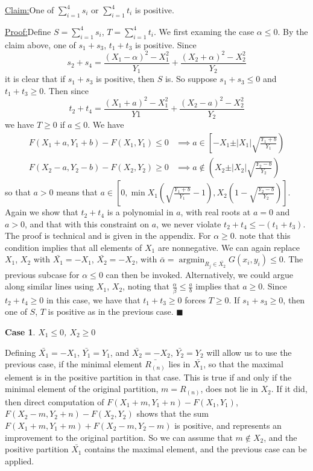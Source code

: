 \documentclass{article}
\theoremstyle{case}
\newtheorem{case}{Case}
\DeclareMathOperator*{\argmin}{argmin} %
\newenvironment{claim}[1]{\par\noindent\underline{Claim:}\space#1}{}
\newenvironment{claimproof}[1]{\par\noindent\underline{Proof:}\space#1}{\hfill $\blacksquare$}
\begin{document}
\begin{claim}
One of $\sum_{i=1}^4 s_i$ or $\sum_{i=1}^4 t_i$ is positive.
\end{claim}
\begin{claimproof}
Define $S =\sum_{i=1}^4 s_i$, $T = \sum_{i=1}^4 t_i$. We first examing the case $\alpha \leq 0$. By the claim above, one of $s_1 + s_3$, $t_1 + t_3$ is positive. Since
\[
s_2 + s_4 = \frac{\left( X_1 - \alpha\right)^2 - X_1^2}{Y_1} + \frac{\left( X_2 + \alpha\right)^2 - X_2^2}{Y_2} 
\]
it is clear that if $s_1 + s_3$ is positive, then $S$ is. So suppose $s_1 + s_3 \leq 0$ and $t_1 + t_3 \geq 0$. Then since
\[
t_2 + t_4  = \frac{\left( X_1 + a\right)^2 - X_1^2}{Y1} + \frac{\left( X_2 - a\right)^2 - X_2^2}{Y_2}
\]
we have $T \geq 0$ if $a \leq 0$. We have
\begin{align*}
F(X_1+a, Y_1+b) - F(X_1, Y_1) \leq 0 & \implies a \in \left[ -X_1 \pm \vert X_1\vert \sqrt{\frac{Y_1+b}{Y_1}}\right) \\
F(X_2-a, Y_2-b) - F(X_2, Y_2) \geq 0 & \implies a \not \in \left( X_2 \pm \vert X_2\vert \sqrt{\frac{Y_2 -b}{Y_2}} \right)
\end{align*}
so that $a > 0$ means that $a \in \left[ 0, \min{X_1\left( \sqrt{\frac{Y_1+b}{Y_1}} - 1\right), X_2\left( 1 - \sqrt{\frac{Y_2-b}{Y_2}} \right)}\right]$. Again we show that $t_2 + t_4$ is a polynomial in $a$, with real roots at $a = 0$ and $a > 0$, and that with this constraint on $a$, we never violate $t_2 + t_4 \leq -\left( t_1 + t_3\right)$. The proof is technical and is given in the appendix.
For $\alpha \geq 0$. note that this condition implies that all elements of $X_1$ are nonnegative. We can again replace $X_1$, $X_2$ with $\bar{X_1} = -X_1$, $\bar{X_2} = -X_2$, with $\bar{\alpha} = \argmin_{R_j \in \bar{X_2}} G(x_i, y_i) \leq 0$. The previous subcase for $\alpha \leq 0$ can then be invoked. Alternatively, we could argue along similar lines using $X_1$, $X_2$, noting that $\frac{\alpha}{\beta} \leq \frac{a}{b}$ implies that $a \geq 0$. Since $t_2 + t_4 \geq 0$ in this case, we have that $t_1 + t_3 \geq 0$ forces $T \geq 0$. If $s_1 + s_3 \geq 0$, then one of $S$, $T$ is positive as in the previous case.
\end{claimproof}

\begin{case}
$X_1 \leq 0$, $X_2 \geq 0$
\end{case}
Defining $\bar{X_1} = -X_1$, $\bar{Y_1} = Y_1$, and $\bar{X_2} = -X_2$, $\bar{Y_2} = Y_2$ will allow us to use the previous case, if the minimal element $\bar{R_{(n)}}$ lies in $\bar{X_1}$, so that the maximal element is in the positive partition in that case. This is true if and only if the minimal element of the original partition, $m = R_{(n)}$, does not lie in $X_2$. If it did, then direct computation of $F(X_1 + m, Y_1 + n) - F(X_1, Y_1)$, $F(X_2 - m, Y_2 + n) - F(X_2, Y_2)$ shows that the sum $F(X_1 + m, Y_1 + m) + F(X_2 - m, Y_2 - m)$ is positive, and represents an improvement to the original partition. So we can assume that $m \not \in X_2$, and the positive partition $\bar{X_1}$ contains the maximal element, and the previous case can be applied.
\end{document}
